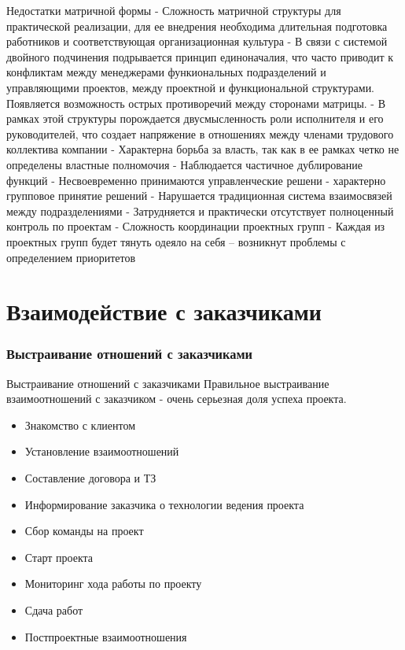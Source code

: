 \documentclass{../industrial-development}
\begin{document}
\begin{}
\lecturenotes
Недостатки матричной формы
- Сложность матричной структуры для практической реализации, для ее внедрения необходима длительная подготовка работников и соответствующая организационная культура
- В связи с системой двойного подчинения подрывается принцип единоначалия, что часто приводит к конфликтам между менеджерами функиональных подразделений и управляющими проектов, между проектной и функциональной структурами. Появляется возможность острых противоречий между сторонами матрицы.
- В рамках этой структуры порождается двусмысленность роли исполнителя и его руководителей, что создает напряжение в отношениях между членами трудового коллектива компании
- Характерна борьба за власть, так как в ее рамках четко не определены властные полномочия
- Наблюдается частичное дублирование функций
- Несвоевременно принимаются управленческие решени - характерно групповое принятие решений
- Нарушается традиционная система взаимосвязей между подразделениями
- Затрудняется и практически отсутствует полноценный контроль по проектам
- Сложность координации проектных групп
- Каждая из проектных групп будет тянуть одеяло на себя – возникнут проблемы  с определением приоритетов

\section{Взаимодействие с заказчиками}

\begin{frame} \frametitle{Выстраивание отношений с заказчиками}
  \begin{block}{Выстраивание отношений с заказчиками}
Правильное выстраивание взаимоотношений с заказчиком - очень серьезная доля успеха проекта. 
  \end{block}

\begin{itemize}
 \item Знакомство с клиентом
 \item Установление взаимоотношений
 \item Составление договора и ТЗ
 \item Информирование заказчика о технологии ведения проекта
 \item Сбор команды на проект 
 \item Старт проекта 
 \item Мониторинг хода работы по проекту
 \item Сдача работ
 \item Постпроектные взаимоотношения
  \end{itemize}
\end{frame}


\end{}
\end{document}

